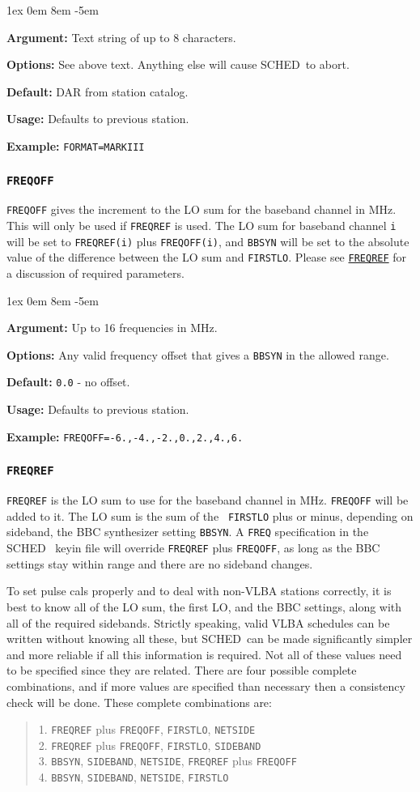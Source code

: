 \documentclass{report}
\newcommand{\schedb}{{\sc SCHED~}}
\newcommand{\rcwbox}[5]{
  \begin{list}{}{\parsep 1ex  \itemsep 0em
                 \leftmargin 8em  \itemindent -5em }
    \item {\bf Argument:} #1
    \item {\bf Options:}  #2
    \item {\bf Default:}  #3
    \item {\bf Usage:}    #4
    \item {\bf Example:}  #5
  \end{list}
}
\begin{document}
\rcwbox
{Text string of up to 8 characters.}
{See above text. Anything else will cause \schedb to abort.}
{DAR from station catalog.}
{Defaults to previous station.}
{{\tt FORMAT=MARKIII}}


\subsubsection{\label{SP:FREQOFF}{\tt FREQOFF}}

{\tt FREQOFF} gives the increment to the LO sum for the baseband
channel in MHz. This will only be used if {\tt FREQREF} is used. The
LO sum for baseband channel {\tt i} will be set to {\tt FREQREF(i)}
plus {\tt FREQOFF(i)}, and {\tt BBSYN} will be set to the absolute
value of the difference between the LO sum and {\tt FIRSTLO}. Please
see 
{\hyperref[SP:FREQREF]{{\tt FREQREF}}} for a discussion of required
parameters.

\rcwbox
{Up to 16 frequencies in MHz.}
{Any valid frequency offset that gives a {\tt BBSYN} in the allowed
range.}
{{\tt 0.0} - no offset.}
{Defaults to previous station.}
{{\tt FREQOFF=-6.,-4.,-2.,0.,2.,4.,6.}}


\subsubsection{\label{SP:FREQREF}{\tt FREQREF}}

{\tt FREQREF} is the LO sum to use for the baseband channel in MHz.
{\tt FREQOFF} will be added to it. The LO sum is the sum of the {\tt
FIRSTLO} plus or minus, depending on sideband, the BBC synthesizer
setting {\tt BBSYN}. A {\tt FREQ} specification in the \schedb
keyin file will override {\tt FREQREF} plus {\tt FREQOFF}, as long as
the BBC settings stay within range and there are no sideband changes.

To set pulse cals properly and to deal with non-VLBA stations
correctly, it is best to know all of the LO sum, the first LO, and the
BBC settings, along with all of the required sidebands. Strictly
speaking, valid VLBA schedules can be written without knowing all
these, but \schedb can be made significantly simpler and more
reliable if all this information is required. Not all of these values
need to be specified since they are related. There are four possible
complete combinations, and if more values are specified than necessary
then a consistency check will be done. These complete combinations
are:
\begin{verse}
1. {\tt FREQREF} plus {\tt FREQOFF}, {\tt FIRSTLO}, {\tt NETSIDE}  \\
2. {\tt FREQREF} plus {\tt FREQOFF}, {\tt FIRSTLO}, {\tt SIDEBAND} \\
3. {\tt BBSYN}, {\tt SIDEBAND}, {\tt NETSIDE},
   {\tt FREQREF} plus {\tt FREQOFF} \\
4. {\tt BBSYN}, {\tt SIDEBAND}, {\tt NETSIDE}, {\tt FIRSTLO} \\
\end{verse}
\end{document}
